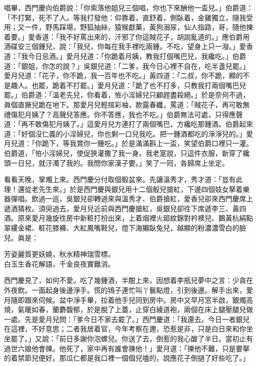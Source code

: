 唱畢，西門慶向伯爵說：「你索落他姐兒三個唱，你也下來酬他一盃兒。」伯爵道：「不打緊，死不了人。等我打發他：仰靠着，直舒着，側臥着，金雞獨立，隨我受用；又一件，野馬踩場，野狐抽絲，猿猴獻菓，黃狗溺尿，仙人指路，哥，隨他揀着要。」{}愛香道：「我不好罵出來的，汗邪了你這賊花子，胡說亂道的。」應伯爵用酒碟安三個鍾兒，說：「我兒，你每在我手裡吃兩鍾。不吃，望身上只一潑。」愛香道：「我今日忌酒。」愛月兒道：「你跪着月姨，教我打個嘴巴兒，我纔吃。」伯爵道：「銀姐，你怎的說？」吳銀兒道：「二爹，我今日心裡不自在，吃半盞兒罷。」愛月兒道：「花子，你不跪，我一百年也不吃。」黃四道：「二叔，你不跪，顯的不是趣人。也罷，跪着不打罷。」愛月兒道：「跪了也不打多，只教我打兩個嘴巴兒罷。」伯爵道：「溫老先兒，你看着，恠小淫婦兒只顧趕盡殺絕。」於是奈何不過，眞個直撅兒跪在地下。那愛月兒輕揎彩袖，款露春纖，罵道：「賊花子，再可敢無禮傷犯月姨了？高聲兒答應。你不答應，我也不吃。」伯爵無法可處，只得應聲道：「再不敢傷犯月姨了。」這愛月兒方連打了兩個嘴巴，方纔吃那鍾酒。{}伯爵起來道：「好個沒仁義的小淫婦兒，你也剩一口兒我吃。把一鍾酒都吃的淨淨兒的。」愛月兒道：「你跪下，等我賞你一鍾吃。」於是滿滿斟上一盃，笑望伯爵口裡只一灌。伯爵道，「恠小淫婦兒，使促狹灌撒了我一身。我老寔說，只這件衣服，新穿了纔頭一日兒，就汙濁了我的。我問你家漢子要。」{}笑了一囘，各歸席上坐定。

看看天晚，掌燭上來。西門慶分付取個骰盆來。先讓溫秀才，秀才道：「豈有此理！還從老先生來。」於是西門慶與銀兒用十二個骰兒搶紅，下邊四個妓女拏着樂器彈唱。飲過一巡，吳銀兒卻轉過來與溫秀才、伯爵搶紅，愛香兒卻來西門慶席上遞酒猜枚。須臾過去，愛月兒近前與西門慶搶紅，吳銀兒卻徃下席遞李三、黃四酒。原來愛月幾旋徃房中新粧打扮出來，上着烟裡火廻紋錦對衿襖兒、鵝黃杭絹點翠縷金裙、粧花膝褲、大紅鳳嘴鞋兒，燈下海獺臥兔兒，越顯的粉濃濃雪白的臉兒。眞是：

\begin{myquote} 
芳姿麗質更妖嬈，秋水精神瑞雪標。\\白玉生香花解語，千金良夜實難消。
\end{myquote} 

西門慶見了，如何不愛。吃了幾鍾酒，半酣上來，因想着李瓶兒夢中之言：少貪在外夜飲。一面起身後邊淨手。慌的鴇子連忙叫丫鬟點燈，引到後邊。解手出來，愛月隨即跟來伺候。盆中淨手畢，拉着他手兒同到房中。房中又早月窓半啟，銀燭高燒，氣暖如春，蘭麝馥郁，於是脫了上蓋，止穿白綾道袍，兩個在床上腿壓腿兒做一處。先是愛月兒問：「爹今日不家去罷了。」西門慶道：「我還去。今日一者銀兒在這裡，不好意思；二者我居着官，今年考察在邇，恐惹是非，只是白日來和你坐坐罷了。」又說：「前日多謝你泡螺兒。你送了去，倒惹的我心酸了半日。當初止有過世六娘他會揀。他死了，家中再有誰會揀他！」{}愛月道：「揀他不難，只是要拏的着禁節兒便好。那瓜仁都是我口裡一個個兒嗑的，說應花子倒撾了好些吃了。」

